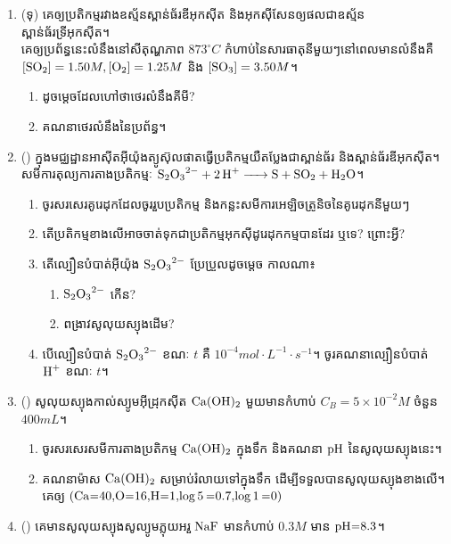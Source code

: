 \documentclass{officialexam}
\begin{document}
\begin{enumerate}[I]
	\item {\color{khtug}(ទុ)} គេឲ្យប្រតិកម្មរវាងឧស្ម័នស្ពាន់ធ័រឌីអុកសុីត និងអុកសុីសែនឲ្យផលជាឧស្ម័នស្ពាន់ធ័រទ្រីអុកសុីត។\\ គេឲ្យប្រព័ន្ធនេះលំនឹងនៅសីតុណ្ហភាព $873^\circ C$ កំហាប់នៃសារធាតុនីមួយៗនៅពេលមានលំនឹងគឺ $\left[\ce{SO2}\right]=1.50M, \left[\ce{O2}\right]=1.25M$ និង $\left[\ce{SO3}\right]=3.50M$។ 
	\begin{enumerate}[k,2]
		\item ដូចម្តេចដែលហៅថាថេរលំនឹងគីមី?
		\item គណនាថេរលំនឹងនៃប្រព័ន្ធ។
	\end{enumerate}
	\item {\color{khtug}()} ក្នុងមជ្ឈដ្ឋានអាសុីតអុីយ៉ុងត្យូស៊ុលផាតធ្វើប្រតិកម្មយឺតប្លែងជាស្ពាន់ធ័រ និងស្ពាន់ធ័រឌីអុកសុីត។\\
	សមីការតុល្យការតាងប្រតិកម្មៈ $\ce{S2O3^{2-} + 2H+ -> S + SO2 + H2O}$។ 
	\begin{enumerate}[m]
		\item ចូរសរសេរគូរេដុកដែលចូររួបប្រតិកម្ម និងកន្លះសមីការអេឡិចត្រូនិចនៃគូរេដុកនីមួយៗ
		\item តើប្រតិកម្មខាងលើអាចចាត់ទុកជាប្រតិកម្មអុកសុីដូរេដុកកម្មបានដែរ ឬទេ? ព្រោះអ្វី?
		\item តើល្បឿនបំបាត់អុីយ៉ុង $\ce{S2O3^{2-}}$ ប្រែប្រួលដូចម្តេច កាលណា៖
		\begin{enumerate}[k,2]
			\item $\ce{S2O3^{2-}}$ កើន? 
			\item ពង្រាវសូលុយស្យុងដើម?
		\end{enumerate}
		\item បើល្បឿនបំបាត់ $\ce{S2O3^{2-}}$ ខណៈ $t$ គឺ $10^{-4}mol\cdot L^{-1}\cdot s^{-1}$។ ចូរគណនាល្បឿនបំបាត់ $\ce{H+}$ ខណៈ $t$។
	\end{enumerate}
	\item {\color{khtug}()} សូលុយស្យុងកាល់ស្យូមអុីដ្រុកសុីត $\ce{Ca(OH)2}$ មួយមានកំហាប់ $C_B=5\times10^{-2}M$ ចំនួន $400mL$។
	\begin{enumerate}[k]
		\item ចូរសរសេរសមីការតាងប្រតិកម្ម $\ce{Ca(OH)2}$ ក្នុងទឹក និងគណនា $\ce{pH}$ នៃសូលុយស្យុងនេះ។
		\item គណនាម៉ាស $\ce{Ca(OH)2}$ សម្រាប់រំលាយទៅក្នុងទឹក ដើម្បីទទួលបានសូលុយស្យុងខាងលើ។\\
		គេឲ្យ $\left(\ce{Ca=40, O=16, H=1, log 5=0.7, log 1=0}\right)$
	\end{enumerate}
	\item {\color{khtug}()} គេមានសូលុយស្យុងសូល្យូមភ្លុយអរួ $\ce{NaF}$ មានកំហាប់ $0.3M$ មាន $\ce{pH=8.3}$។

\end{enumerate}
\end{document}
